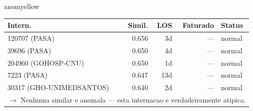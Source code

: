 \documentclass[a4paper,10pt]{article}
\begin{document}
\begin{anomalycard}[Internacao 167884 | GHO-PETROBRAS | MODERADO (z=2.59)]{anomyellow}
\begin{tabular}{l r r r l}\toprule\textbf{Intern.} & \textbf{Simil.} & \textbf{LOS} & \textbf{Faturado} & \textbf{Status} \\\midrule
120707 (PASA) & 0.656 & 3d & --- & \textcolor{jcubeblue}{normal} \\
39696 (PASA) & 0.650 & 4d & --- & \textcolor{jcubeblue}{normal} \\
204960 (GOHOSP-CNU) & 0.650 & 1d & --- & \textcolor{jcubeblue}{normal} \\
7223 (PASA) & 0.647 & 13d & --- & \textcolor{jcubeblue}{normal} \\
30317 (GHO-UNIMEDSANTOS) & 0.640 & 2d & --- & \textcolor{jcubeblue}{normal} \\
\multicolumn{5}{l}{\textcolor{jcubeblue}{\small $\rightarrow$ Nenhuma similar e anomala --- esta internacao e verdadeiramente atipica.}} \\
\bottomrule\end{tabular}


\end{anomalycard}

\newpage
\end{document}
